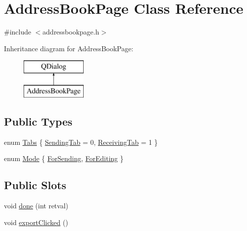 \hypertarget{class_address_book_page}{}\section{Address\+Book\+Page Class Reference}
\label{class_address_book_page}


{\ttfamily \#include $<$addressbookpage.\+h$>$}

Inheritance diagram for Address\+Book\+Page\+:\begin{figure}[H]
\begin{center}
\leavevmode
\includegraphics[height=2.000000cm]{class_address_book_page}
\end{center}
\end{figure}
\subsection*{Public Types}
\begin{DoxyCompactItemize}
\item 
enum \hyperlink{class_address_book_page_a7ef3cf6c3e4613894af313a05335dbe3}{Tabs} \{ \hyperlink{class_address_book_page_a7ef3cf6c3e4613894af313a05335dbe3a0317158231d27f7965037521fea1998d}{Sending\+Tab} = 0, 
\hyperlink{class_address_book_page_a7ef3cf6c3e4613894af313a05335dbe3ac0029a5d46e35919fb2df9c4f370e8a9}{Receiving\+Tab} = 1
 \}
\item 
enum \hyperlink{class_address_book_page_a0a8f8e590dc6f18e829fde039f984464}{Mode} \{ \hyperlink{class_address_book_page_a0a8f8e590dc6f18e829fde039f984464a3591dbaa5496b5791059d7df5d293a1c}{For\+Sending}, 
\hyperlink{class_address_book_page_a0a8f8e590dc6f18e829fde039f984464a86b6565fcddce6edf578c0e470471296}{For\+Editing}
 \}
\end{DoxyCompactItemize}
\subsection*{Public Slots}
\begin{DoxyCompactItemize}
\item 
void \hyperlink{class_address_book_page_a4f585f3ff33a3c7066b2fcda803f862f}{done} (int retval)
\item 
void \hyperlink{class_address_book_page_ae5b20525c7f1cf805eace9aafe308d42}{export\+Clicked} ()
\end{DoxyCompactItemize}
